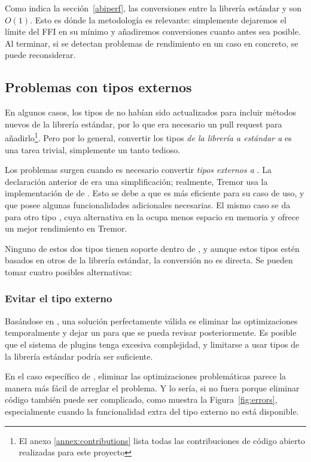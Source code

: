 Como indica la sección~\ref{abiperf}, las conversiones entre la librería
estándar y \abistable son $O(1)$. Esto es dónde la metodología \work es
relevante: simplemente dejaremos el límite del FFI en su mínimo y añadiremos
conversiones cuanto antes sea posible. Al terminar, si se detectan problemas de
rendimiento en un caso en concreto, se puede reconsiderar.

\subsection{Problemas con tipos externos}

En algunos casos, los tipos de \abistable no habían sido actualizados para
incluir métodos nuevos de la librería estándar, por lo que era necesario un pull
request para añadirlo\footnote{El anexo \ref{annex:contributions} lista todas
las contribuciones de código abierto realizadas para este proyecto}. Pero por lo
general, convertir los tipos \emph{de la librería a estándar a \abistable} es
una tarea trivial, simplemente un tanto tedioso.

Los problemas surgen cuando es necesario convertir \emph{tipos externos a
\abistable}. La declaración anterior de  era una simplificación;
realmente, Tremor usa la implementación de  de
. Esto se debe a que es más eficiente para su caso de uso, y
que posee algunas funcionalidades adicionales necesarias. El mismo caso se da
para otro tipo , cuya alternativa en la \crate {} ocupa
menos espacio en memoria y ofrece un mejor rendimiento en Tremor.

Ninguno de estos dos tipos tienen soporte dentro de \abistable, y aunque estos
tipos estén basados en otros de la librería estándar, la conversión no es
directa. Se pueden tomar cuatro posibles alternativas:

\subsubsection{Evitar el tipo externo}

Basándose en \work, una solución perfectamente válida es eliminar las
optimizaciones temporalmente y dejar un  para que se pueda revisar
posteriormente. Es posible que el sistema de plugins tenga excesiva complejidad,
y limitarse a usar tipos de la librería estándar podría ser suficiente.

En el caso específico de , eliminar las optimizaciones problemáticas
parece la manera más fácil de arreglar el problema. Y lo sería, si no fuera
porque eliminar código también puede ser complicado, como muestra la
Figura~\ref{fig:errors}, especialmente cuando la funcionalidad extra del tipo
externo no está disponible.

